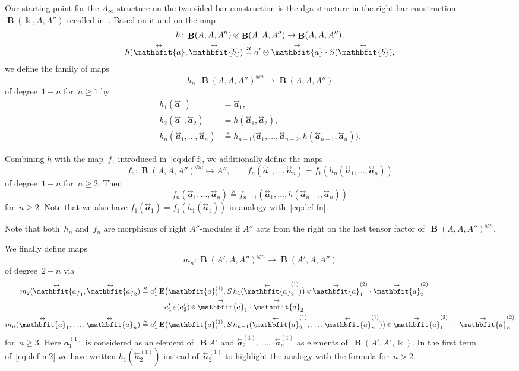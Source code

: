 \documentclass[letterpaper]{amsart}
\numberwithin{equation}{section}
\theoremstyle{plain}
\theoremstyle{definition}
\theoremstyle{remark}
\let\epsilon\varepsilon
\def\smallotimes{\mathbin{\mkern-1mu\vcenter{\hbox{$\scriptstyle\otimes$}}\mkern-1mu}}
\def\Ainf{A_{\infty}}
\DeclareMathOperator{\BB}{\mathbf{B}}
\def\kk{\Bbbk}
\def\aa{\mathbfit{a}}
\def\laa{\overset{\text{$\leftarrow$}}{\aa}}
\def\raa{\overset{\text{$\rightarrow$}}{\aa}}
\def\taa{\overset{\text{$\leftrightarrow$}}{\aa}}
\def\bb{\mathbfit{b}}
\def\tbb{\overset{\text{$\leftrightarrow$}}{\bb}}
\def\EE{\mathbf{E}}
\def\swee#1#2{#1^{(#2)}}
\let\KS\varkappa
\def\eqKS{\stackrel{\KS}{=}}
\def\ff{f_{1}}
\begin{document}
Our starting point for the $\Ainf$-structure on the two-sided bar construction
is the dga structure in the right bar construction~$\BB(\kk,A,A'')$ recalled in~.
Based on it and on the map
\begin{gather}
  h\colon \BB(A,A,A'')\otimes \BB(A,A,A'') \to \BB(A,A,A''), \\
  \notag h(\taa,\tbb) \eqKS a'\otimes \raa\cdot S(\tbb),
\end{gather}
we define the family of maps
\begin{equation}
  h_{n}\colon \BB(A,A,A'')^{\otimes n} \to \BB(A,A,A'')
\end{equation}
of degree~$1-n$ for~$n\ge1$ by
\begin{align}
  h_{1}(\taa_{1}) &= \taa_{1}, \\
  h_{2}(\taa_{1},\taa_{2}) &= h(\taa_{1},\taa_{2}), \\
  h_{n}(\taa_{1},\dots,\taa_{n}) &\eqKS h_{n-1}\bigl(\taa_{1},\dots,\taa_{n-2},h(\taa_{n-1},\taa_{n})\bigr).
\end{align}

Combining $h$ with the map~$\ff$ introduced in~\eqref{eq:def-f},
we additionally define the maps
\begin{equation}
  \label{eq:def-fn}
  f_{n}\colon \BB(A,A,A'')^{\otimes n}\mapsto A'',
  \qquad
  f_{n}(\taa_{1},\dots,\taa_{n}) = \ff(h_{n}(\taa_{1},\dots,\taa_{n}))
\end{equation}
of degree~$1-n$ for~$n\ge2$.
Then %
\begin{equation}
  f_{n}(\taa_{1},\dots,\taa_{n})\eqKS f_{n-1}(\taa_{1},\dots,h(\taa_{n-1},\taa_{n}))
\end{equation}
for~$n\ge2$. Note that we also have $\ff(\taa_{1})=\ff(h_{1}(\taa_{1}))$ in analogy with~\eqref{eq:def-fn}.

Note that both~$h_{n}$ and~$f_{n}$ are morphisms of right $A''$-modules if $A''$ acts from the right
on the last tensor factor of~$\BB(A,A,A'')^{\otimes n}$.

We finally define maps
\begin{equation}
  m_{n}\colon \BB(A',A,A'')^{\otimes n} \to \BB(A',A,A'')
\end{equation}
of degree~$2-n$ via
\begin{align}
  \label{eq:def-m2}
  m_{2}(\taa_{1},\taa_{2}) &\eqKS a'_{1}\,\EE\bigl(\swee{\aa_{1}}{1}, S\,h_{1}(\swee{\laa_{2}}{1})\bigr)
    \smallotimes \swee{\raa_{1}}{2}\cdot\swee{\raa_{2}}{2} \\
  \notag &\qquad + a'_{1}\,\epsilon(a'_{2})\smallotimes \raa_{1}\cdot\raa_{2} \\
  m_{n}(\taa_{1},\dots,\taa_{n}) &\eqKS a'_{1}\,\EE\bigl(\swee{\aa_{1}}{1}, S\,h_{n-1}(\swee{\laa_{2}}{1},\dots,\swee{\laa_{n}}{1})\bigr)
    \smallotimes \swee{\raa_{1}}{2}\cdots\swee{\raa_{n}}{2}
\end{align}
for~$n\ge3$.
Here $\swee{\aa_{1}}{1}$ is considered as an element of~$\BB A'$
and $\swee{\laa_{2}}{1}$,~\dots,~$\swee{\laa_{n}}{1}$ as elements of~$\BB(A',A',\kk)$.
In the first term of~\eqref{eq:def-m2} we have written $h_{1}(\swee{\laa_{2}}{1})$ instead of~$\swee{\laa_{2}}{1}$
to highlight the analogy with the formula for~$n>2$.
\end{document}
